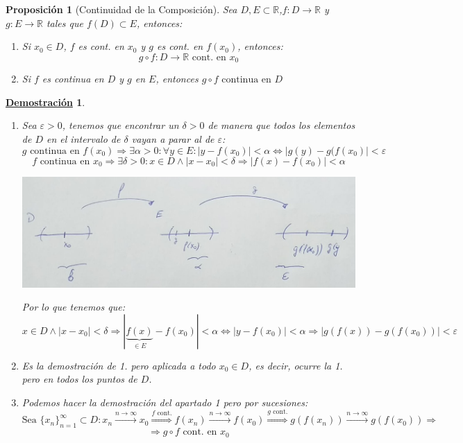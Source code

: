\documentclass[10pt,a4paper,openright]{book}
\theoremstyle{break}
\newtheorem{prop}{Proposición}[chapter]
\newtheorem*{demo}{\underline{Demostración}}
\begin{document}
\begin{prop}[Continuidad de la Composición]
Sea $D, E\subset \mathbb R$,$f: D\longrightarrow \mathbb R$ y $g: E\longrightarrow \mathbb R$ tales que $f(D)\subset E$, entonces:
\begin{enumerate}
\item Si $x_0\in D$, $f$ es cont. en $x_0$ y $g$ es cont. en $f(x_0)$, entonces:
$$g\circ f: D\longrightarrow \mathbb R\mbox{ cont. en }x_0$$

\item Si $f$ es continua en $D$ y $g$ en $E$, entonces $g\circ f\mbox{ continua en } D$
\end{enumerate}
\end{prop}
\begin{demo}
\begin{enumerate}
\item Sea $\varepsilon>0$, tenemos que encontrar un $\delta>0$ de manera que todos los elementos de $D$ en el intervalo de $\delta $ vayan a parar al de $\varepsilon$:
$$g\mbox{ continua en }f(x_0)\Rightarrow \exists \alpha>0: \forall y\in E: |y-f(x_0)|<\alpha\Leftrightarrow |g(y)-g(f(x_0)|<\varepsilon$$
$$f\mbox{ continua en }x_0\Rightarrow \exists \delta>0: x\in D \wedge |x-x_0|<\delta\Rightarrow |f(x)-f(x_0)|<\alpha$$

\begin{center}
\includegraphics[scale=0.35]{continuidad de composicion}
\end{center}

Por lo que tenemos que:
$$x\in D \wedge |x-x_0|<\delta\Rightarrow |\underbrace{f(x)}_{\in E}-f(x_0)|<\alpha\Leftrightarrow |y-f(x_0)|<\alpha\Rightarrow |g(f(x))-g(f(x_0))|<\varepsilon$$

\item Es la demostración de 1. pero aplicada a todo $x_0\in D$, es decir, ocurre la 1. pero en todos los puntos de $D$. 

\item Podemos hacer la demostración del apartado 1 pero por sucesiones:
$$\mbox{Sea }\{x_n\}_{n=1}^\infty\subset D: x_n\xrightarrow{n\rightarrow\infty} x_0\stackrel{f \mbox{ cont.}}{\Rightarrow} f(x_n)\xrightarrow{n\rightarrow\infty} f(x_0)\stackrel{g \mbox{ cont.}}{\Rightarrow}g(f(x_n))\xrightarrow{n\rightarrow \infty} g(f(x_0))\Rightarrow$$
$$\Rightarrow g\circ f\mbox{ cont. en } x_0$$
\end{enumerate}
\end{demo}
\end{document}
